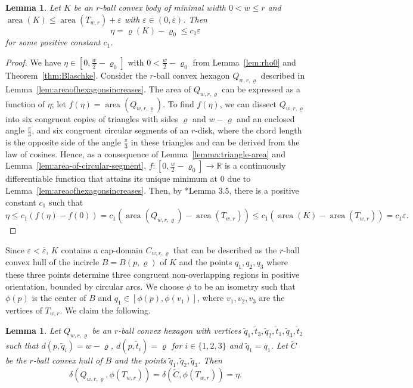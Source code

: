 \documentclass[12pt,reqno]{amsart}
\newtheorem{lemma}[theorem]{Lemma}
\theoremstyle{remark}
\newcommand{\R}{{\mathbb R}}
\DeclareMathOperator{\area}{\mathrm{area}}
\begin{document}
\begin{lemma}\label{lem:boundingeta}
Let $K$ be an $r$-ball convex body of minimal width $0<w\leq r$ and $\area(K)\leq\area(T_{w,r})+\varepsilon$ with $\varepsilon\in(0,\overline{\varepsilon})$. Then
$$
\eta=\varrho(K)-\varrho_0\leq c_1\varepsilon
$$
for some positive constant $c_1$.
\end{lemma}
\begin{proof}
We have $\eta\in\left[0,\frac{w}{2}-\varrho_0\right]$ with $0<\frac{w}{2}-\varrho_0$ from Lemma~\ref{lem:rho0} and Theorem~\ref{thm:Blaschke}. Consider the $r$-ball convex hexagon $Q_{w,r,\varrho}$ described in Lemma~\ref{lem:areaofhexagonsincreases}. The area of $Q_{w,r,\varrho}$ can be expressed as a function of $\eta$; let $f(\eta)=\area(Q_{w,r,\varrho})$. To find $f(\eta)$, we can dissect $Q_{w,r,\varrho}$ into six congruent copies of triangles with sides $\varrho$ and $w-\varrho$ and an enclosed angle $\tfrac{\pi}{3}$, and six congruent circular segments of an $r$-disk, where the chord length is the opposite side of the angle $\tfrac{\pi}{3}$ in these triangles and can be derived from the law of cosines. Hence, as a consequence of Lemma~\ref{lemma:triangle-area} and Lemma~\ref{lem:area-of-circular-segment}, $f\colon\left[0,\frac{w}{2}-\varrho_0\right]\to\R$ is a continuously differentiable function that attains its unique minimum at 0 due to Lemma~\ref{lem:areaofhexagonsincreases}. Then, by \cite{FS}*{Lemma 3.5}, there is a positive constant $c_1$ such that
$$
\eta\leq c_1(f(\eta)-f(0))=c_1(\area(Q_{w,r,\varrho})-\area(T_{w,r}))\leq c_1(\area(K)-\area(T_{w,r}))=c_1\varepsilon.
$$
\end{proof}

Since $\varepsilon<\overline{\varepsilon}$, $K$ contains a cap-domain $C_{w,r,\varrho}$ that can be described as the $r$-ball convex hull of the incircle $B=B(p,\varrho)$ of $K$ and the points $q_1,q_2,q_3$ where these three points determine three congruent non-overlapping regions in positive orientation, bounded by circular arcs. We choose $\phi$ to be an isometry such that $\phi(p)$ is the center of $B$ and $q_1\in[\phi(p),\phi(v_1)]$, where $v_1,v_2,v_3$ are the vertices of $T_{w,r}$. We claim the following.

\begin{lemma}\label{lem:symmetriccapdomain-triangle}
Let $Q_{w,r,\varrho}$ be an $r$-ball convex hexagon with vertices $\widetilde{q}_1,\widetilde{t}_3,\widetilde{q}_2,\widetilde{t}_1,\widetilde{q}_3,\widetilde{t}_2$ such that $d(p,\widetilde{q}_i)=w-\varrho$, $d(p,\widetilde{t}_i)=\varrho$ for $i\in\{1,2,3\}$ and $\widetilde{q}_1=q_1$. Let $\widetilde{C}$ be the $r$-ball convex hull of $B$ and the points $\widetilde{q}_1,\widetilde{q}_2,\widetilde{q}_3$. Then
$$
\delta(Q_{w,r,\varrho},\phi(T_{w,r}))=\delta(\widetilde{C},\phi(T_{w,r}))=\eta.
$$
\end{lemma}
\end{document}

